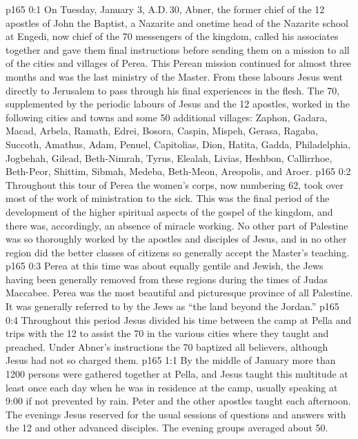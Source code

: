 \author{Midwayer Commission}
\vs p165 0:1 On Tuesday, January 3, A.D.\,30, Abner, the former chief of the 12 apostles of John the Baptist, a Nazarite and onetime head of the Nazarite school at Engedi, now chief of the 70 messengers of the kingdom, called his associates together and gave them final instructions before sending them on a mission to all of the cities and villages of Perea. This Perean mission continued for almost three months and was the last ministry of the Master. From these labours Jesus went directly to Jerusalem to pass through his final experiences in the flesh. The 70, supplemented by the periodic labours of Jesus and the 12 apostles, worked in the following cities and towns and some 50 additional villages: Zaphon, Gadara, Macad, Arbela, Ramath, Edrei, Bosora, Caspin, Mispeh, Gerasa, Ragaba, Succoth, Amathus, Adam, Penuel, Capitolias, Dion, Hatita, Gadda, Philadelphia, Jogbehah, Gilead, Beth\hyp{}Nimrah, Tyrus, Elealah, Livias, Heshbon, Callirrhoe, Beth\hyp{}Peor, Shittim, Sibmah, Medeba, Beth\hyp{}Meon, Areopolis, and Aroer.
\vs p165 0:2 Throughout this tour of Perea the women’s corps, now numbering 62, took over most of the work of ministration to the sick. This was the final period of the development of the higher spiritual aspects of the gospel of the kingdom, and there was, accordingly, an absence of miracle working. No other part of Palestine was so thoroughly worked by the apostles and disciples of Jesus, and in no other region did the better classes of citizens so generally accept the Master’s teaching.
\vs p165 0:3 Perea at this time was about equally gentile and Jewish, the Jews having been generally removed from these regions during the times of Judas Maccabee. Perea was the most beautiful and picturesque province of all Palestine. It was generally referred to by the Jews as “the land beyond the Jordan.”
\vs p165 0:4 Throughout this period Jesus divided his time between the camp at Pella and trips with the 12 to assist the 70 in the various cities where they taught and preached. Under Abner’s instructions the 70 baptized all believers, although Jesus had not so charged them.
\vs p165 1:1 By the middle of January more than 1200 persons were gathered together at Pella, and Jesus taught this multitude at least once each day when he was in residence at the camp, usually speaking at 9:00 if not prevented by rain. Peter and the other apostles taught each afternoon. The evenings Jesus reserved for the usual sessions of questions and answers with the 12 and other advanced disciples. The evening groups averaged about 50.
